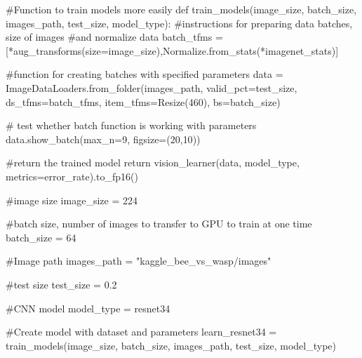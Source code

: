 \documentclass[
  letterpaper,
  DIV=11,
  numbers=noendperiod]{scrartcl}
\newenvironment{Shaded}{\begin{snugshade}}{\end{snugshade}}
\newcommand{\CommentTok}[1]{\textcolor[rgb]{0.37,0.37,0.37}{#1}}
\newcommand{\ControlFlowTok}[1]{\textcolor[rgb]{0.00,0.23,0.31}{#1}}
\newcommand{\DecValTok}[1]{\textcolor[rgb]{0.68,0.00,0.00}{#1}}
\newcommand{\FloatTok}[1]{\textcolor[rgb]{0.68,0.00,0.00}{#1}}
\newcommand{\KeywordTok}[1]{\textcolor[rgb]{0.00,0.23,0.31}{#1}}
\newcommand{\NormalTok}[1]{\textcolor[rgb]{0.00,0.23,0.31}{#1}}
\newcommand{\OperatorTok}[1]{\textcolor[rgb]{0.37,0.37,0.37}{#1}}
\newcommand{\StringTok}[1]{\textcolor[rgb]{0.13,0.47,0.30}{#1}}
\begin{document}
\hypertarget{custom-trainmodels}{}
\begin{Shaded}
\begin{Highlighting}[]
\CommentTok{\#Function to train models more easily}
\KeywordTok{def}\NormalTok{ train\_models(image\_size, batch\_size, images\_path, test\_size, model\_type):}
    \CommentTok{\#instructions for preparing data batches, size of images}
    \CommentTok{\#and normalize data}
\NormalTok{    batch\_tfms }\OperatorTok{=}\NormalTok{ [}\OperatorTok{*}\NormalTok{aug\_transforms(size}\OperatorTok{=}\NormalTok{image\_size),Normalize.from\_stats(}\OperatorTok{*}\NormalTok{imagenet\_stats)]}

    \CommentTok{\#function for creating batches with specified parameters}
\NormalTok{    data }\OperatorTok{=}\NormalTok{ ImageDataLoaders.from\_folder(images\_path,}
\NormalTok{                                        valid\_pct}\OperatorTok{=}\NormalTok{test\_size,}
\NormalTok{                                        ds\_tfms}\OperatorTok{=}\NormalTok{batch\_tfms,}
\NormalTok{                                        item\_tfms}\OperatorTok{=}\NormalTok{Resize(}\DecValTok{460}\NormalTok{),}
\NormalTok{                                        bs}\OperatorTok{=}\NormalTok{batch\_size)}
    
    \CommentTok{\# test whether batch function is working with parameters}
\NormalTok{    data.show\_batch(max\_n}\OperatorTok{=}\DecValTok{9}\NormalTok{, figsize}\OperatorTok{=}\NormalTok{(}\DecValTok{20}\NormalTok{,}\DecValTok{10}\NormalTok{))}

    \CommentTok{\#return the trained model}
    \ControlFlowTok{return}\NormalTok{ vision\_learner(data, model\_type, metrics}\OperatorTok{=}\NormalTok{error\_rate).to\_fp16()}
\end{Highlighting}
\end{Shaded}

\hfill\break

\begin{Shaded}
\begin{Highlighting}[]
\CommentTok{\#image size}
\NormalTok{image\_size }\OperatorTok{=} \DecValTok{224}

\CommentTok{\#batch size, number of images to transfer to GPU to train at one time}
\NormalTok{batch\_size }\OperatorTok{=} \DecValTok{64}

\CommentTok{\#Image path}
\NormalTok{images\_path }\OperatorTok{=} \StringTok{"kaggle\_bee\_vs\_wasp/images"}

\CommentTok{\#test size}
\NormalTok{test\_size }\OperatorTok{=} \FloatTok{0.2}

\CommentTok{\#CNN model}
\NormalTok{model\_type }\OperatorTok{=}\NormalTok{ resnet34}

\CommentTok{\#Create model with dataset and parameters}
\NormalTok{learn\_resnet34 }\OperatorTok{=}\NormalTok{ train\_models(image\_size, batch\_size, images\_path, test\_size, model\_type)}
\end{Highlighting}
\end{Shaded}
\end{document}
